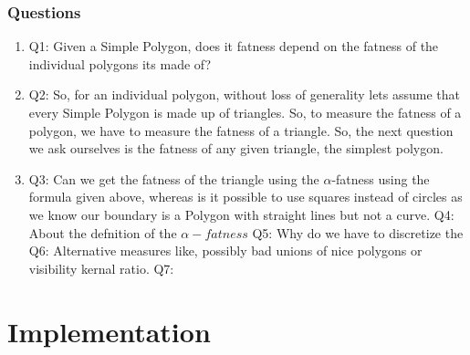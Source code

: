 \documentclass{article}
\begin{document}
\subsubsection{Questions} 
\begin{enumerate}
\item Q1: Given a Simple Polygon, does it fatness depend on the fatness of the
  individual polygons its made of?
\item Q2: So, for an individual polygon, without loss of generality lets assume that every Simple Polygon is made up of triangles. So, to measure the fatness of a polygon, we  have to measure the fatness of a triangle. So, the next question we ask ourselves is the fatness of any given triangle, the simplest polygon.
\item
Q3: Can we get the fatness of the triangle using the $\alpha$-fatness using the formula given above, whereas is it possible to use squares instead of circles as we know our boundary is a Polygon with straight lines but not a curve.
Q4: About the defnition of the $\alpha-fatness$
Q5: Why do we have to discretize the 
Q6: Alternative measures like, possibly bad unions of nice polygons or visibility kernal ratio. 
Q7: 
\end{enumerate}

\section{Implementation}
\end{document}

